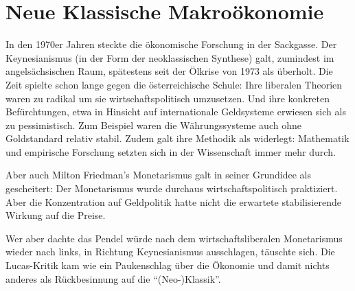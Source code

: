 %
%
%

\chapter{Neue Klassische Makroökonomie}
\label{Neue Makro}

In den 1970er Jahren steckte die ökonomische Forschung in der Sackgasse. Der Keynesianismus (in der Form der neoklassischen Synthese) galt, zumindest im angelsächsischen Raum, spätestens seit der Ölkrise von 1973 als überholt. Die Zeit spielte schon lange gegen die österreichische Schule: Ihre liberalen Theorien waren zu radikal um sie wirtschaftspolitisch umzusetzen. Und ihre konkreten Befürchtungen, etwa in Hinsicht auf internationale Geldsysteme erwiesen sich als zu pessimistisch. Zum Beispiel waren die Währungssysteme auch ohne Goldstandard relativ stabil. Zudem galt ihre Methodik als widerlegt: Mathematik und empirische Forschung setzten sich in der Wissenschaft immer mehr durch. 

Aber auch Milton Friedman's Monetarismus galt in seiner Grundidee als gescheitert: Der Monetarismus wurde durchaus wirtschaftspolitisch praktiziert. Aber die Konzentration auf Geldpolitik hatte nicht die erwartete stabilisierende Wirkung auf die Preise.

Wer aber dachte das Pendel würde nach dem wirtschaftsliberalen Monetarismus wieder nach links, in Richtung Keynesianismus ausschlagen, täuschte sich. Die Lucas-Kritik kam wie ein Paukenschlag über die Ökonomie und damit nichts anderes als Rückbesinnung auf die "`(Neo-)Klassik"'.


